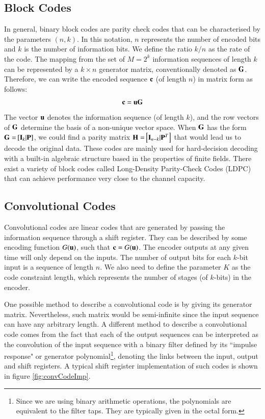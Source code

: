 \documentclass[12pt,a4paper,openright]{report}
\begin{document}
 
 \subsection{Block Codes}
  
 In general, binary block codes  are parity check codes that can be characterised by the parameters $(n,k)$. In this notation, $n$ represents the number of encoded bits and $k$ is the number of information bits. We define the ratio $k/n$ as the rate of the code. The mapping from the set of $M=2^k$ information sequences of length $k$ can be represented by a $k\times n$ generator matrix, conventionally denoted as $\bf{G}$. Therefore, we can write the encoded sequence $\bf{c}$ (of length $n$) in matrix form as follows:
\begin{equation}
 {\bf{c}} ={{\bf{u}}}{\bf{G}}
 \end{equation}
The vector  $\bf{u}$ denotes the information sequence (of length $k$), and the row vectors of $\bf{G}$ determine the basis of a non-unique vector space. When $\bf{G}$ has the form ${\bf{G = }}\left[ {{{\bf{I}}_k}{\bf{|P}}} \right]$, we could find a parity matrix ${\bf{H = }}\left[ {{{\bf{I}}_{n - k}}{\bf{|}}{{\bf{P}}^T}} \right]$ that would lead us to decode the original data\cite{SklarBook}. These codes are mainly used for hard-decision decoding with a built-in algebraic structure based in the properties of finite fields. There exist a variety of block codes called Long-Density Parity-Check Codes (LDPC) that can achieve performance very close to the channel capacity.  


 \subsection{Convolutional Codes}
 Convolutional codes are linear codes that are generated by passing the information sequence through a shift register. They can be described by some encoding function $G({\bf{u}})$, such that ${\bf{c}}=G({\bf{u}})$. The encoder outputs at any given time will only depend on the inputs. The number of output bits for each $k$-bit input is a sequence of length $n$. We also need to define the parameter $K$ as the code constraint length, which represents the number of stages (of $k$-bits) in the encoder. 

One possible method to describe a convolutional code is by giving its generator matrix. Nevertheless, such matrix would be semi-infinite since the input sequence can have any arbitrary length\cite{Proakis}. A different method to describe a convolutional code comes from the fact that each of the output sequences can be interpreted as the convolution of the input sequence with a binary filter defined by its ``impulse response" or generator polynomial\footnote{Since we are using binary arithmetic operations, the polynomials are equivalent to the filter taps. They are typically given in the octal form.}, denoting the links between the input, output and shift registers. A typical shift register implementation of such codes is shown in figure \ref{fig:convCodeImp}.
 
\end{document}
